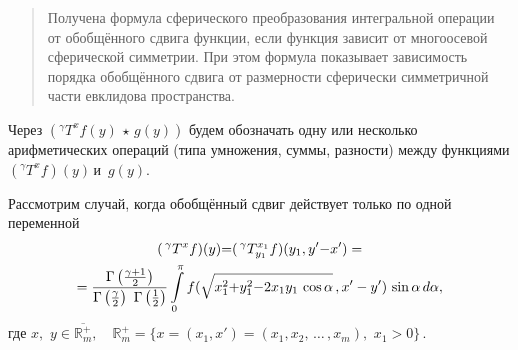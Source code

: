 








\begin{quote}
 {\small
Получена формула сферического преобразования интегральной операции от обобщённого сдвига функции, если функция зависит от многоосевой сферической симметрии. При этом формула показывает зависимость порядка обобщённого сдвига от размерности сферически симметричной части евклидова пространства.}
 \end{quote}

	Через
	$
	\left(^\gamma T^xf(y)\,\star\,g(y)\right)
	$
	будем обозначать одну или несколько арифметических операций (типа умножения, суммы, разности) между функциями $\left(^\gamma T^xf\right)(y)$\,и \,$g(y)$.

	 Рассмотрим случай, когда обобщённый сдвиг действует только по одной переменной
\begin{multline*}
	(\,^\gamma T^{x}f)(y){=}(\,^\gamma T_{y_1}^{x_1}f)(y_1,y'{-}x')=
	\\=
	\frac{\Gamma\left(\gamma+1\over2\right)}{\Gamma\left(\frac{\gamma}{2}\right)\,\,\Gamma\left(\frac{1}{2}\right)}\int\limits_0^\pi
	f(\sqrt{x_1^2{+}y^2_1{-}2x_1y_1\,\cos\alpha}\,,x'-y')\,\sin\alpha
	\,d\alpha,
\end{multline*}
где $x,\,\,y\in\overline{\mathbb{R}^+_m},\quad	\mathbb{R}^+_m{=}\{x{=}(x_1,x'){=}(x_1,x_2,\,\ldots\,,x_m),\,\,x_1>0\}\,.$

